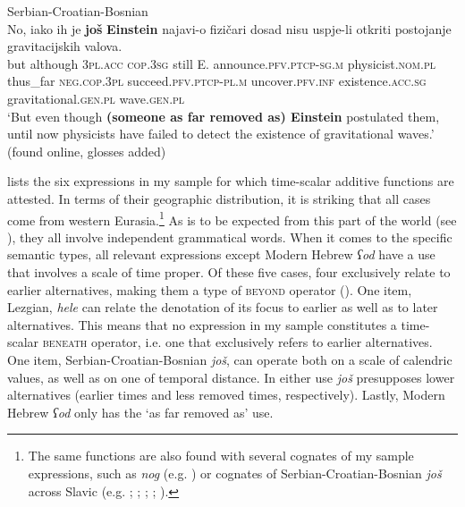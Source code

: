 \begin{exe}
	\ex Serbian-Croatian-Bosnian\label{exTimeScalarEinstein}\\
	\gll No, iako ih je \textbf{još} \textbf{Einstein} najavi-o fizičari dosad nisu uspje-li otkriti postojanje gravitacijskih valova. \\
but although 3\textsc{pl}.\textsc{acc} \textsc{cop}.3\textsc{sg} still E. announce.\textsc{pfv}.\textsc{ptcp}-\textsc{sg}.\textsc{m} physicist.\textsc{nom}.\textsc{pl} thus\_far \textsc{neg}.\textsc{cop}.3\textsc{pl} succeed.\textsc{pfv}.\textsc{ptcp}-\textsc{pl}.\textsc{m} uncover.\textsc{pfv}.\textsc{inf} existence.\textsc{acc}.\textsc{sg} gravitational.\textsc{gen}.\textsc{pl} wave.\textsc{gen}.\textsc{pl}\\
\glt \lq But even though \textbf{(someone as far removed as) Einstein} postulated them, until now physicists have failed to detect the existence of gravitational waves.\rq{ }(found online, glosses added)%
\end{exe}

 lists the six expressions in my sample for which time-scalar additive functions are attested. In terms of their geographic distribution, it is striking that all cases come from western Eurasia.\footnote{The same functions are also found with several cognates of my sample expressions, such as  \textit{nog} (e.g. \cite[ch. 11.3]{Vandeweghe1992}) or cognates of Serbian\hyp Croatian\hyp Bosnian \textit{još} across Slavic (e.g. \cite{Boguslavsky1996}; \cite[s.v. \textit{jeszcze}]{PWN}; \cite[s.v. \textit{ще}]{CYM11}; \cite{Komarek1979}; \cite{Mustajoki1988}).} As is to be expected from this part of the world (see \cite{vanderAuwera1998}), they all involve independent grammatical words. When it comes to the specific semantic types, all relevant expressions except Modern Hebrew \textit{ʕod} have a use that involves a scale of time proper. Of these five cases, four exclusively relate to earlier alternatives, making them a type of \textsc{beyond} operator (). One item, Lezgian, \textit{hele} can relate the denotation of its focus to earlier as well as to later alternatives. This means that no expression in my sample constitutes a time-scalar \textsc{beneath} operator, i.e. one that exclusively refers to earlier alternatives. One item, Serbian\hyp Croatian\hyp Bosnian \textit{još}, can operate both on a scale of calendric values, as well as on one of temporal distance. In either use \textit{još} presupposes lower alternatives (earlier times and less removed times, respectively). Lastly, Modern Hebrew \textit{ʕod} only has the \lq as far removed as\rq{} use.

